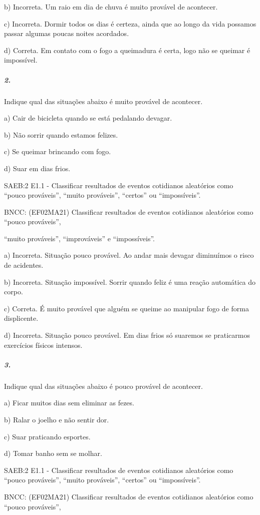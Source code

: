 b) Incorreta. Um raio em dia de chuva é muito provável de acontecer.

c) Incorreta. Dormir todos os dias é certeza, ainda que ao longo da vida
possamos passar algumas poucas noites acordados.

d) Correta. Em contato com o fogo a queimadura é certa, logo não se
queimar é impossível.

\subparagraph{2.}\label{section-76}

Indique qual das situações abaixo é muito provável de acontecer.

a) Cair de bicicleta quando se está pedalando devagar.

b) Não sorrir quando estamos felizes.

c) Se queimar brincando com fogo.

d) Suar em dias frios.

SAEB:2 E1.1 - Classificar resultados de eventos cotidianos aleatórios
como ``pouco prováveis'', ``muito prováveis'', ``certos'' ou
``impossíveis''.

BNCC: (EF02MA21) Classificar resultados de eventos cotidianos aleatórios
como ``pouco prováveis'',

``muito prováveis'', ``improváveis'' e ``impossíveis''.

a) Incorreta. Situação pouco provável. Ao andar mais devagar diminuímos
o risco de acidentes.

b) Incorreta. Situação impossível. Sorrir quando feliz é uma reação
automática do corpo.

c) Correta. É muito provável que alguém se queime ao manipular fogo de
forma displicente.

d) Incorreta. Situação pouco provável. Em dias frios só suaremos se
praticarmos exercícios físicos intensos.

\subparagraph{3.}\label{section-77}

Indique qual das situações abaixo é pouco provável de acontecer.

a) Ficar muitos dias sem eliminar as fezes.

b) Ralar o joelho e não sentir dor.

c) Suar praticando esportes.

d) Tomar banho sem se molhar.

SAEB:2 E1.1 - Classificar resultados de eventos cotidianos aleatórios
como ``pouco prováveis'', ``muito prováveis'', ``certos'' ou
``impossíveis''.

BNCC: (EF02MA21) Classificar resultados de eventos cotidianos aleatórios
como ``pouco prováveis'',

